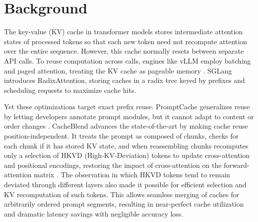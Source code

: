 \section{Background}
\label{sec:ch2_bg}


The key-value (KV) cache in transformer models stores intermediate attention states of processed tokens so that each new token need not recompute attention over the entire sequence. However, this cache normally resets between separate API calls. To reuse computation across calls, engines like vLLM employ batching and paged attention, treating the KV cache as pageable memory \cite{kwon2023vllm}. SGLang \cite{zheng2024sglangefficientexecutionstructured} introduces RadixAttention, storing caches in a radix tree keyed by prefixes and scheduling requests to maximize cache hits.

Yet these optimizations target exact prefix reuse. PromptCache  generalizes reuse by letting developers annotate prompt modules, but it cannot adapt to content or order changes \cite{gim2024promptcachemodularattention}. CacheBlend advances the state-of-the-art by making cache reuse position-independent. It treats the prompt as composed of chunks, checks for each chunk if it has stored KV state, and when reassembling chunks recomputes only a selection of HKVD (High-KV-Deviation) tokens to update cross-attention and positional encodings, restoring the impact of cross-attention on the forward-attention matrix \cite{yao2025cacheblendfastlargelanguage}. The observation in which HKVD tokens tend to remain deviated through different layers also made it possible for efficient selection and KV recomputation of such tokens. This allows seamless merging of caches for arbitrarily ordered prompt segments, resulting in near-perfect cache utilization and dramatic latency savings with negligible accuracy loss.
